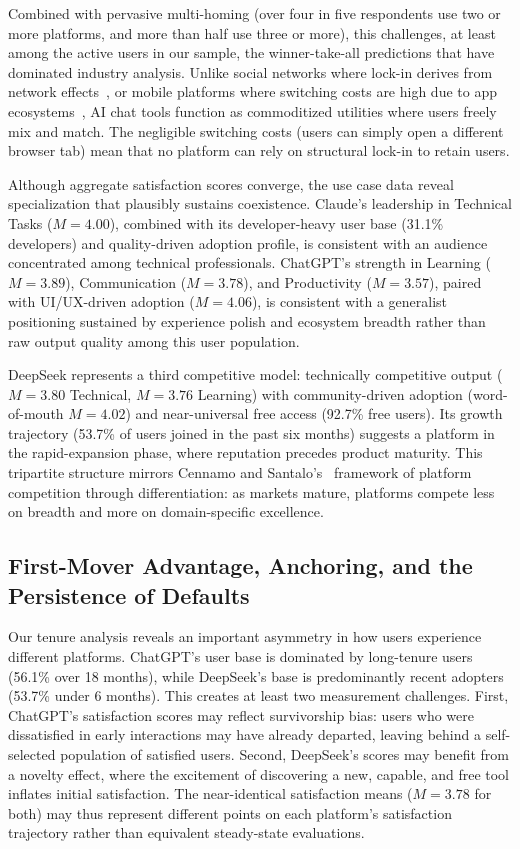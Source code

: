 \documentclass[10pt,twocolumn]{article}
\begin{document}
Combined with pervasive multi-homing (over four in five respondents use two or more platforms, and more than half use three or more), this challenges, at least among the active users in our sample, the winner-take-all predictions that have dominated industry analysis. Unlike social networks where lock-in derives from network effects~\cite{katz1985}, or mobile platforms where switching costs are high due to app ecosystems~\cite{zhu2012}, AI chat tools function as commoditized utilities where users freely mix and match. The negligible switching costs (users can simply open a different browser tab) mean that no platform can rely on structural lock-in to retain users.

Although aggregate satisfaction scores converge, the use case data reveal specialization that plausibly sustains coexistence. Claude's leadership in Technical Tasks ($M=4.00$), combined with its developer-heavy user base (31.1\% developers) and quality-driven adoption profile, is consistent with an audience concentrated among technical professionals. ChatGPT's strength in Learning ($M=3.89$), Communication ($M=3.78$), and Productivity ($M=3.57$), paired with UI/UX-driven adoption ($M=4.06$), is consistent with a generalist positioning sustained by experience polish and ecosystem breadth rather than raw output quality among this user population.

DeepSeek represents a third competitive model: technically competitive output ($M=3.80$ Technical, $M=3.76$ Learning) with community-driven adoption (word-of-mouth $M=4.02$) and near-universal free access (92.7\% free users). Its growth trajectory (53.7\% of users joined in the past six months) suggests a platform in the rapid-expansion phase, where reputation precedes product maturity. This tripartite structure mirrors Cennamo and Santalo's~\cite{cennamo2013} framework of platform competition through differentiation: as markets mature, platforms compete less on breadth and more on domain-specific excellence.


\subsection{First-Mover Advantage, Anchoring, and the Persistence of Defaults}

Our tenure analysis reveals an important asymmetry in how users experience different platforms. ChatGPT's user base is dominated by long-tenure users (56.1\% over 18 months), while DeepSeek's base is predominantly recent adopters (53.7\% under 6 months). This creates at least two measurement challenges. First, ChatGPT's satisfaction scores may reflect survivorship bias: users who were dissatisfied in early interactions may have already departed, leaving behind a self-selected population of satisfied users. Second, DeepSeek's scores may benefit from a novelty effect, where the excitement of discovering a new, capable, and free tool inflates initial satisfaction. The near-identical satisfaction means ($M=3.78$ for both) may thus represent different points on each platform's satisfaction trajectory rather than equivalent steady-state evaluations.
\end{document}
